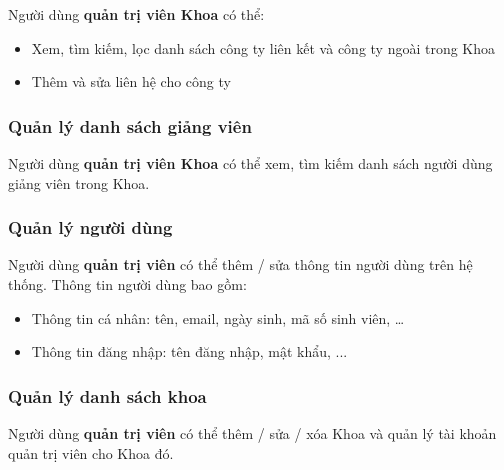 \documentclass[./../main.tex]{subfiles}
\begin{document}
Người dùng \textbf{quản trị viên Khoa} có thể:

\begin{itemize}
	\item

	      Xem, tìm kiếm, lọc danh sách công ty liên kết và công ty ngoài trong
	      Khoa

	\item

	      Thêm và sửa liên hệ cho công ty

\end{itemize}

\hypertarget{quux1ea3n-luxfd-danh-suxe1ch-giux1ea3ng-viuxean}{%
	\subsubsection{Quản lý danh sách giảng
		viên}\label{quux1ea3n-luxfd-danh-suxe1ch-giux1ea3ng-viuxean}}

Người dùng \textbf{quản trị viên Khoa} có thể xem, tìm kiếm danh sách
người dùng giảng viên trong Khoa.

\hypertarget{quux1ea3n-luxfd-ngux1b0ux1eddi-duxf9ng}{%
	\subsubsection{Quản lý người
		dùng}\label{quux1ea3n-luxfd-ngux1b0ux1eddi-duxf9ng}}

Người dùng \textbf{quản trị viên} có thể thêm / sửa thông tin người dùng
trên hệ thống. Thông tin người dùng bao gồm:

\begin{itemize}
	\item

	      Thông tin cá nhân: tên, email, ngày sinh, mã số sinh viên, \ldots{}

	\item

	      Thông tin đăng nhập: tên đăng nhập, mật khẩu, ...

\end{itemize}

\hypertarget{quux1ea3n-luxfd-danh-suxe1ch-khoa}{%
	\subsubsection{Quản lý danh sách
		khoa}\label{quux1ea3n-luxfd-danh-suxe1ch-khoa}}

Người dùng \textbf{quản trị viên} có thể thêm / sửa / xóa Khoa và quản
lý tài khoản quản trị viên cho Khoa đó.
\end{document}
